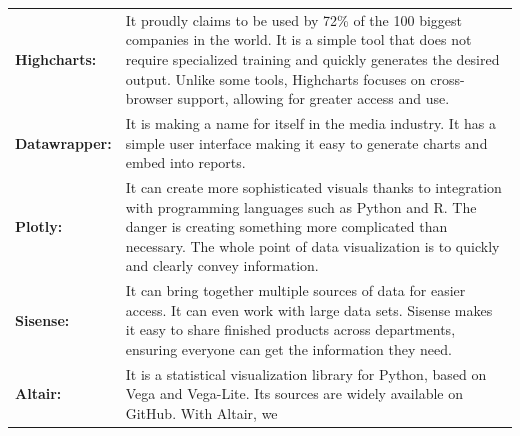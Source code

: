 \documentclass[]{book}
\theoremstyle{definition}
\theoremstyle{definition}
\theoremstyle{definition}
\theoremstyle{remark}
\begin{document}
\begin{longtable}[]{@{}ll@{}}
\begin{minipage}[t]{0.16\columnwidth}
\textbf{Highcharts:}\strut
\end{minipage} & \begin{minipage}[t]{0.78\columnwidth}\raggedright\strut
It proudly claims to be used by 72\% of the 100 biggest companies in the
world. It is a simple tool that does not require specialized training
and quickly generates the desired output. Unlike some tools, Highcharts
focuses on cross-browser support, allowing for greater access and
use.\strut
\end{minipage}\tabularnewline
\begin{minipage}[t]{0.16\columnwidth}\raggedright\strut
\textbf{Datawrapper:}\strut
\end{minipage} & \begin{minipage}[t]{0.78\columnwidth}\raggedright\strut
It is making a name for itself in the media industry. It has a simple
user interface making it easy to generate charts and embed into
reports.\strut
\end{minipage}\tabularnewline
\begin{minipage}[t]{0.16\columnwidth}\raggedright\strut
\textbf{Plotly:}\strut
\end{minipage} & \begin{minipage}[t]{0.78\columnwidth}\raggedright\strut
It can create more sophisticated visuals thanks to integration with
programming languages such as Python and R. The danger is creating
something more complicated than necessary. The whole point of data
visualization is to quickly and clearly convey information.\strut
\end{minipage}\tabularnewline
\begin{minipage}[t]{0.16\columnwidth}\raggedright\strut
\textbf{Sisense:}\strut
\end{minipage} & \begin{minipage}[t]{0.78\columnwidth}\raggedright\strut
It can bring together multiple sources of data for easier access. It can
even work with large data sets. Sisense makes it easy to share finished
products across departments, ensuring everyone can get the information
they need.\strut
\end{minipage}\tabularnewline
\begin{minipage}[t]{0.16\columnwidth}\raggedright\strut
\textbf{Altair:}\strut
\end{minipage} & \begin{minipage}[t]{0.78\columnwidth}\raggedright\strut
It is a statistical visualization library for Python, based on Vega and
Vega-Lite. Its sources are widely available on GitHub. With Altair, we

\end{minipage}
\end{longtable}
\end{document}
